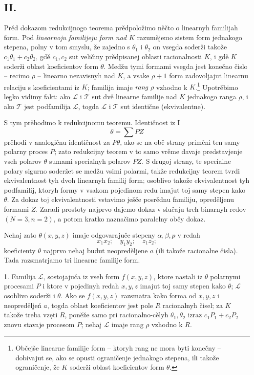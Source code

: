 \documentclass[11pt]{article}
\begin{document}
\subsection*{II.}
Prěd dokazom redukcijnogo teorema prědpoložimo něčto o linearnyh familijah form. Pod {\itshape linearnoju familijeju form nad $K$} razumějemo sistem form jednakogo stepena, polny v tom smyslu, že zajedno s $\theta_1$ i $\theta_2$ on vsegda soderži takože $c_1\theta_1+c_2\theta_2$, gdě $c_1,c_2$ sut veličiny prědpisanej oblasti racionalnosti $K$, i gdě $K$ soderži oblast koeficientov form $\theta$. Medžu tymi formami vsegda jest konečno čislo -- recimo $\rho$ -- linearno nezavisnyh nad $K$, a vsake $\rho+1$ form zadovoljajut linearnu relaciju s koeficientami iz $K$; familija imaje {\itshape rang $\rho$} vzhodno k $K$.\footnote{Občejše linearne familije form -- ktoryh rang ne mora byti konečny -- dobivajut se, ako se opusti ograničenje jednakogo stepena, ili takože ograničenje, že $K$ soderži oblast koeficientov form $\theta$.} Upotrěbimo legko vidimy fakt: ako $\mathcal L$ i $\mathcal T$ sut dvě linearne familije nad $K$ jednakogo ranga $\rho$, i ako $\mathcal T$ jest podfamilija $\mathcal L$, togda $\mathcal L$ i $\mathcal T$ sut identične (ekvivalentne).

S tym prěhodimo k redukcijnomu teoremu. Identičnost iz I
\[
  \theta=\sum PZ
\]
prěhodi v analogičnu identičnost za $P\theta$, ako se na obě strany priměni ten samy polarny proces $P$; zato redukcijny teorem v to samo vrěme davaje predstavjenje vseh polarov $\theta$ sumami specialnyh polarov $PZ$. S drugoj strany, te specialne polary sigurno soderžet se medžu vsimi polarmi, takže redukcijny teorem tvrdi ekvivalentnost tyh dvoh linearnyh familij form; osoblivo takože ekvivalentnost tyh podfamilij, ktoryh formy v vsakom pojedinom redu imajut toj samy stepen kako $\theta$. Za dokaz toj ekvivalentnosti vstavimo ješče posrědnu familiju, opreděljenu formami $Z$. Zaradi prostoty najprvo dajemo dokaz v slučaju treh binarnyh redov $(N=3,n=2)$, a potom kratko naznačimo paralelny občy dokaz.

Nehaj zato $\theta(x,y,z)$ imaje odgovarajuče stepeny $\alpha,\beta,p$ v redah
\[
  x_1x_2;\quad y_1y_2;\quad z_1z_2;
\]
koeficienty $\theta$ najprvo nehaj budut neopreděljene $a$ (ili takože racionalne čisla). Tada razsmatrjamo tri linearne familije form.

1. Familija $\mathcal L$, sostojajuča iz vseh form $f(x,y,z)$, ktore nastali iz $\theta$ polarnymi procesami $P$ i ktore v pojedinyh redah $x,y,z$ imajut toj samy stepen kako $\theta$; $\mathcal L$ osoblivo soderži i $\theta$. Ako se $f(x,y,z)$ razsmatra kako forma od $x,y,z$ i neopreděljeń $a$, togda oblast koeficientov jest pole $R$ racionalnyh čisel; za $K$ takože treba vzęti $R$, poněže samo pri racionalno-cělyh $\theta_1,\theta_2$ izraz $c_1P_1+c_2P_2$ znovu stavaje procesom $P$; nehaj $\mathcal L$ imaje rang $\rho$ vzhodno k $R$.
\end{document}
